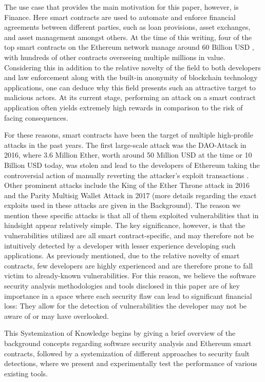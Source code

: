 \documentclass[letterpaper,twocolumn,10pt]{article}
\begin{document}
The use case that provides the main motivation for this paper, however, is Finance. Here smart contracts are used to automate and enforce financial agreements between different parties, such as loan provisions, asset exchanges, and asset management amongst others. At the time of this writing, four of the top smart contracts on the Ethereum network manage around 60 Billion USD \cite{nr1} \cite{nr2} \cite{nr1T} \cite{nr2T}, with hundreds of other contracts overseeing multiple millions in value. Considering this in addition to the relative novelty of the field to both developers and law enforcement along with the built-in anonymity of blockchain technology applications, one can deduce why this field presents such an attractive target to malicious actors. At its current stage, performing an attack on a smart contract application often yields extremely high rewards in comparison to the risk of facing consequences.

For these reasons, smart contracts have been the target of multiple high-profile attacks in the past years. The first large-scale attack was the DAO-Attack in 2016, where 3.6 Million Ether, worth around 50 Million USD at the time or 10 Billion USD today,  was stolen and lead to the developers of Ethereum taking the controversial action of manually reverting the attacker's exploit transactions \cite{atzei_bartoletti_cimoli_2017}. Other prominent attacks include the King of the Ether Throne attack in 2016 and the Parity Multisig Wallet Attack in 2017 \cite{atzei_bartoletti_cimoli_2017} (more details regarding the exact exploits used in these attacks are given in the Background). The reason we mention these specific attacks is that all of them exploited vulnerabilities that in hindsight appear relatively simple. The key significance, however, is that the vulnerabilities utilized are all smart contract-specific, and may therefore not be intuitively detected by a developer with lesser experience developing such applications. As previously mentioned, due to the relative novelty of smart contracts, few developers are highly experienced and are therefore prone to fall victim to already-known vulnerabilities. For this reason, we believe the software security analysis methodologies and tools disclosed in this paper are of key importance in a space where each security flaw can lead to significant financial loss: They allow for the detection of vulnerabilities the developer may not be aware of or may have overlooked.

This Systemization of Knowledge begins by giving a brief overview of the background concepts regarding software security analysis and Ethereum smart contracts, followed by a systemization of different approaches to security fault detections, where we present and experimentally test the performance of various existing tools.
\end{document}

